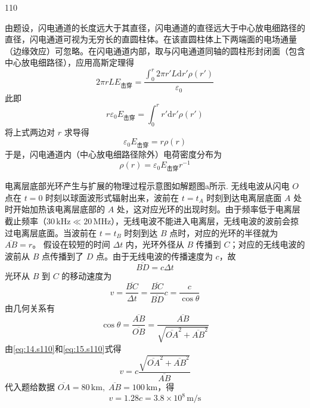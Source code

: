 \begin{solution}{110}
\begin{subsolution}
由题设，闪电通道的长度远大于其直径，闪电通道的直径远大于中心放电细路径的直径，闪电通道可视为无穷长的直圆柱体。在该直圆柱体上下两端面的电场通量（边缘效应）可忽略。在闪电通道内部，取与闪电通道同轴的圆柱形封闭面（包含中心放电细路径），应用高斯定理得
\begin{equation}
2\pi r L E_{\mathrm{击穿}} = \frac{\int_{0}^{r} 2\pi r' L \mathrm{d}r' \rho(r')}{\varepsilon_{0}}
\label{eq:10.s110}
\end{equation}
此即
\[
r \varepsilon_{0} E_{\mathrm{击穿}} = \int_{0}^{r} r' \mathrm{d}r' \rho(r')
\]
将上式两边对 $r$ 求导得
\begin{equation}
\varepsilon_{0} E_{\mathrm{击穿}} = r \rho(r)
\label{eq:11.s110}
\end{equation}
于是，闪电通道内（中心放电细路径除外）电荷密度分布为
\begin{equation}
\rho(r) = \varepsilon_{0} E_{\mathrm{击穿}} r^{-1}
\label{eq:12.s110}
\end{equation}
\end{subsolution}

\begin{subsolution}
电离层底部光环产生与扩展的物理过程示意图如解题图a所示.
无线电波从闪电 $O$ 点在 $t=0$ 时刻以球面波形式辐射出来，波前在 $t=t_{A}$ 时刻到达电离层底面 $A$ 处时开始加热该电离层底部的 $A$ 处，这对应光环的出现时刻。由于频率低于电离层截止频率（$30\,\mathrm{kHz} \ll 20\,\mathrm{MHz}$），无线电波不能进入电离层，无线电波的波前会掠过电离层底面。当波前在 $t=t_{B}$ 时刻到达 $B$ 点时，对应的光环的半径就为 $\overline{AB}=r$。
假设在较短的时间 $\Delta t$ 内，光环外径从 $B$ 传播到 $C$；对应的无线电波的波前从 $B$ 点传播到了 $D$ 点。由于无线电波的传播速度为 $c$，故
\begin{equation}
\overline{BD} = c \Delta t
\label{eq:13.s110}
\end{equation}
光环从 $B$ 到 $C$ 的移动速度为
\begin{equation}
v = \frac{\overline{BC}}{\Delta t} = \frac{\overline{BC}}{\overline{BD}} c = \frac{c}{\cos\theta}
\label{eq:14.s110}
\end{equation}
由几何关系有
\begin{equation}
\cos\theta = \frac{\overline{AB}}{\overline{OB}} = \frac{\overline{AB}}{\sqrt{\overline{OA}^{2} + \overline{AB}^{2}}}
\label{eq:15.s110}
\end{equation}
由\eqref{eq:14.s110}和\eqref{eq:15.s110}式得
\begin{equation}
v = c \frac{\sqrt{\overline{OA}^{2} + \overline{AB}^{2}}}{\overline{AB}}
\label{eq:16.s110}
\end{equation}
代入题给数据 $\overline{OA}=80\,\mathrm{km},\;\overline{AB}=100\,\mathrm{km}$，得
\begin{equation}
v = 1.28c = 3.8 \times 10^{8}\,\mathrm{m/s}
\label{eq:17.s110}
\end{equation}
\end{subsolution}


\end{solution}
